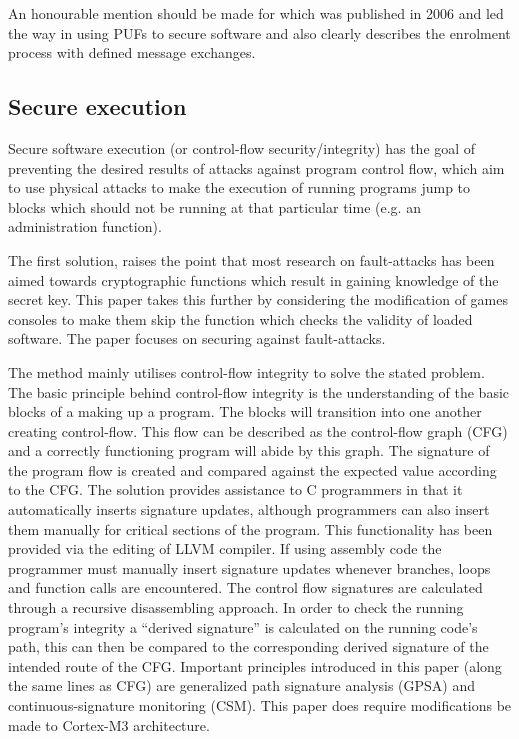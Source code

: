 An honourable mention should be made for \cite{Simpson2006} which was published in 2006 and led the way in using PUFs to secure software and also clearly describes the enrolment process with defined message exchanges.

\subsection{Secure execution}\label{secureExecutionSolutions}

Secure software execution (or control-flow security/integrity) has the goal of preventing the desired results of attacks against program control flow, which aim to use physical attacks to make the execution of running programs jump to blocks which should not be running at that particular time (e.g. an administration function).

The first solution, \cite{Werner2016} raises the point that most research on fault-attacks has been aimed towards cryptographic functions which result in gaining knowledge of the secret key. This paper takes this further by considering the modification of games consoles to make them skip the function which checks the validity of loaded software. The paper focuses on securing against fault-attacks.

The method mainly utilises control-flow integrity to solve the stated problem. The basic principle behind control-flow integrity is the understanding of the basic blocks of a making up a program. The blocks will transition into one another creating control-flow. This flow can be described as the control-flow graph (CFG) and a correctly functioning program will abide by this graph. The signature of the program flow is created and compared against the expected value according to the CFG. The solution provides assistance to C programmers in that it automatically inserts signature updates, although programmers can also insert them manually for critical sections of the program. This functionality has been provided via the editing of LLVM compiler. If using assembly code the programmer must manually insert signature updates whenever branches, loops and function calls are encountered. The control flow signatures are calculated through a  recursive disassembling approach. In order to check the running  program's integrity a ``derived signature'' is calculated on the running code's path, this can then be compared to the corresponding derived signature of the intended route of the CFG. Important principles introduced in this paper (along the same lines as CFG) are generalized path signature analysis (GPSA) and continuous-signature monitoring (CSM). This paper does require modifications be made to Cortex-M3 architecture.

